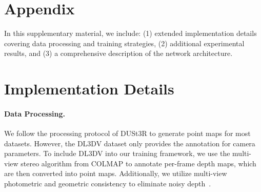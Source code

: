 \newpage 
\appendix

\section*{Appendix}

In this supplementary material, we include: (1) extended implementation details covering data processing and training strategies, (2) additional experimental results, and (3) a comprehensive description of the network architecture.


\section{Implementation Details}

\paragraph{Data Processing.} 
% 
We follow the processing protocol of DUSt3R to generate point maps for most datasets. 
% 
However, the DL3DV dataset only provides the annotation for  camera parameters.  
% 
To include DL3DV into our training framework, we use the multi-view stereo algorithm from COLMAP to annotate per-frame depth maps, which are then converted into point maps. 
% 
Additionally, we utilize multi-view photometric and geometric consistency to eliminate noisy depth~\cite{yan2020dense}.
% 
% 
% 
